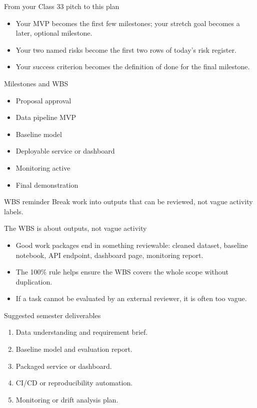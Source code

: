 \begin{frame}{From your Class 33 pitch to this plan}
\begin{itemize}
\item Your MVP becomes the first few milestones; your stretch goal becomes a later, optional milestone.
\item Your two named risks become the first two rows of today's risk register.
\item Your success criterion becomes the definition of done for the final milestone.
\end{itemize}
\coursefooter
\end{frame}

\begin{frame}{Milestones and WBS}
\begin{itemize}
\item Proposal approval
\item Data pipeline MVP
\item Baseline model
\item Deployable service or dashboard
\item Monitoring active
\item Final demonstration
\end{itemize}
\begin{block}{WBS reminder}
Break work into outputs that can be reviewed, not vague activity labels.
\end{block}
\coursefooter
\end{frame}

\begin{frame}{The WBS is about outputs, not vague activity}
\begin{itemize}
\item Good work packages end in something reviewable: cleaned dataset, baseline notebook, API endpoint, dashboard page, monitoring report.
\item The 100\% rule helps ensure the WBS covers the whole scope without duplication.
\item If a task cannot be evaluated by an external reviewer, it is often too vague.
\end{itemize}
\coursefooter
\end{frame}

\begin{frame}{Suggested semester deliverables}
\begin{enumerate}
\item Data understanding and requirement brief.
\item Baseline model and evaluation report.
\item Packaged service or dashboard.
\item CI/CD or reproducibility automation.
\item Monitoring or drift analysis plan.
\end{enumerate}
\coursefooter
\end{frame}


